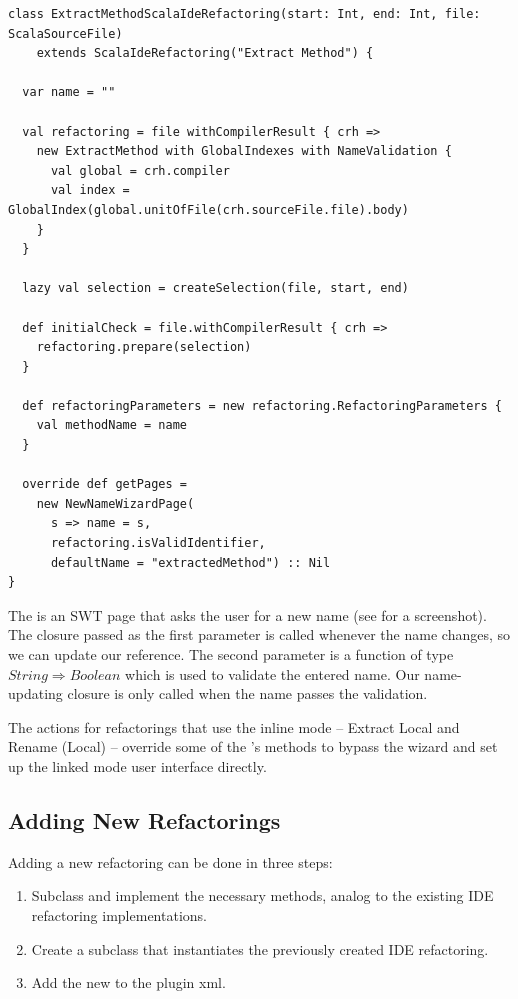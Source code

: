 \documentclass[10pt,a4paper,oneside]{scrreprt}
\begin{document}
\begin{lstlisting}
class ExtractMethodScalaIdeRefactoring(start: Int, end: Int, file: ScalaSourceFile) 
    extends ScalaIdeRefactoring("Extract Method") {
  
  var name = ""
  
  val refactoring = file withCompilerResult { crh => 
    new ExtractMethod with GlobalIndexes with NameValidation {
      val global = crh.compiler
      val index = GlobalIndex(global.unitOfFile(crh.sourceFile.file).body)
    }
  }

  lazy val selection = createSelection(file, start, end)

  def initialCheck = file.withCompilerResult { crh =>
    refactoring.prepare(selection)
  }
  
  def refactoringParameters = new refactoring.RefactoringParameters {
    val methodName = name
  }
  
  override def getPages = 
    new NewNameWizardPage(
      s => name = s, 
      refactoring.isValidIdentifier, 
      defaultName = "extractedMethod") :: Nil 
}
\end{lstlisting}

The  is an SWT page that asks the user for a new name (see  for a screenshot). The closure passed as the first parameter is called whenever the name changes, so we can update our reference. The second parameter is a function of type $String \Rightarrow Boolean$ which is used to validate the entered name. Our name-updating closure is only called when the name passes the validation.

The actions for refactorings that use the inline mode -- Extract Local and Rename (Local) -- override some of the 's methods to bypass the wizard and set up the linked mode user interface directly.

\subsection{Adding New Refactorings}

Adding a new refactoring can be done in three steps:

\begin{enumerate}
  \item Subclass  and implement the necessary methods, analog to the existing IDE refactoring implementations.
  \item Create a  subclass that instantiates the previously created IDE refactoring.
  \item Add the new  to the plugin xml.
\end{enumerate}
\end{document}
